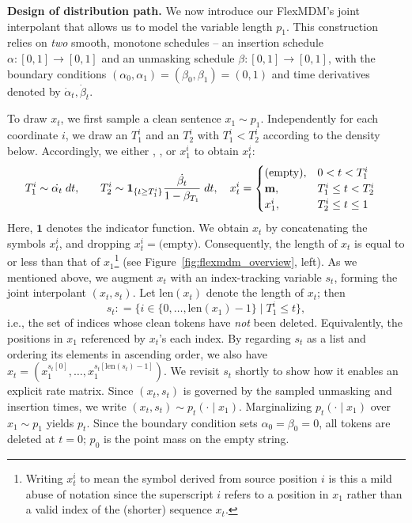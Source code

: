\textbf{Design of distribution path.} 
We now introduce our FlexMDM's joint interpolant that allows us to model the variable length $p_1$. This construction relies on \emph{two} smooth, monotone schedules \--- an insertion schedule $\alpha \colon [0,1]\to [0,1]$ and an unmasking schedule $\beta \colon [0,1] \to [0,1]$, with the boundary conditions $(\alpha_0,\alpha_1)=(\beta_0,\beta_1)=(0,1)$ and time derivatives denoted by $\dot{\alpha}_t,\dot{\beta}_t$.

To draw $x_t$, we first sample a clean sentence $x_1 \sim p_1$. Independently for each coordinate $i$, we draw an  $T_1^i$ and an  $T_2^i$ with $T_1^i < T_2^i$ according to the density below. Accordingly, we either , , or  $x_1^i$ to obtain $x_t^i$:
\begin{align} \label{eqn::FlexMDM_interpolant}T_1^i \sim \dot{\alpha_t} \; dt, & \quad \quad T_2^i \sim \mathbf{1}_{\{t \ge T_1^i\}}\frac{\dot{\beta_t}}{1-\beta_{T_1}} \; dt, \quad  x_t^i = \begin{cases}
        \text{(empty)}, & 0 < t < T_1^i \\
        \mathbf{m}, & T_1^i \leq t <  T_2^i \\
        x_1^i, &   T_2^i \leq t \leq 1
    \end{cases}
\end{align} 
Here, $\mathbf{1}$ denotes the indicator function. We obtain $x_t$ by concatenating the symbols $x_t^i$, and dropping $x_t^i=\text{(empty)}$. Consequently, the length of $x_t$ is equal to or less than that of $x_1$\footnote{Writing $x_t^i$ to mean the symbol derived from source position $i$ is this a mild abuse of notation since the superscript $i$ refers to a position in $x_1$ rather than a valid index of the (shorter) sequence $x_t$.}  (see Figure~\ref{fig:flexmdm_overview}, left). 
As we mentioned above, we augment $x_t$ with an index-tracking variable $s_t$, forming the joint interpolant $(x_t,s_t)$. Let $\mathrm{len}(x_t)$ denote the length of $x_t$; then
\begin{equation*}
    s_t \colon= \{i \in \{0,\dots,\mathrm{len}(x_1)-1\} \mid T_1^i \le t\},
\end{equation*}
i.e., the set of indices whose clean tokens have \emph{not} been deleted. Equivalently, the positions in $x_1$ referenced by $x_t$'s each index. By regarding $s_t$ as a list and ordering its elements in ascending order, we also have $x_t=(x_1^{s_t[0]},\dots,x_1^{s_t[\mathrm{len}(s_t)-1]})$. We revisit $s_t$ shortly to show how it enables an explicit rate matrix.   Since $(x_t,s_t)$ is governed by the sampled unmasking and insertion times, we write $(x_t,s_t)\sim p_t(\cdot \mid x_1)$. Marginalizing $p_t(\cdot \mid x_1)$ over $x_1 \sim p_1$ yields $p_t$. Since the boundary condition sets $\alpha_0=\beta_0=0$, all tokens are deleted at $t=0$; $p_0$ is the point mass on the empty string.


